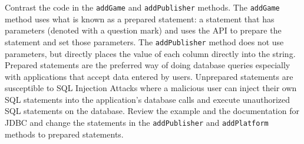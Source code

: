 \documentclass[12pt]{scrartcl}
\begin{document}
Contrast the code in the \texttt{addGame} and \texttt{addPublisher} 
methods.  The \texttt{addGame} method uses what is known 
as a prepared statement: a statement that has parameters (denoted 
with a question mark) and uses the API to prepare the statement and 
set those parameters.  The \texttt{addPublisher} method 
does not use parameters, but directly places the value of each column 
directly into the string.  Prepared statements are the preferred way of 
doing database queries especially with applications that accept data 
entered by users.  Unprepared statements are susceptible to SQL 
Injection Attacks where a malicious user can inject their own SQL 
statements into the application's database calls and execute unauthorized 
SQL statements on the database.  Review the example and the 
documentation for JDBC and change the statements in the 
\texttt{addPublisher} and \texttt{addPlatform} 
methods to prepared statements.

	
\end{document}
